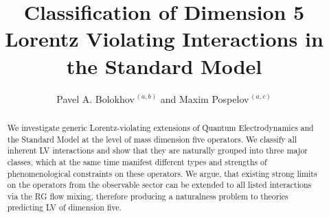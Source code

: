 \documentclass[12pt,preprintnumbers,nofootinbib]{revtex4}
\begin{document}
\renewcommand{\thefootnote}{\fnsymbol{footnote}}


\title{Classification of Dimension 5 Lorentz Violating Interactions 
		in the Standard Model}


\author{Pavel A. Bolokhov$^{\,(a,b)}$ and Maxim Pospelov$^{\,(a,c)}$}




%
%

\begin{abstract}
	We investigate generic Lorentz-violating extensions of Quantum Electrodynamics and
	the Standard Model at the level of mass dimension five operators.
	We classify all inherent LV interactions and show that they
	are naturally grouped into three major classes,
	which at the same time manifest different types and strengths of phenomenological constraints
	on these operators.
	We argue, that existing strong limits on the operators from the observable sector
	can be extended to all listed interactions via the RG flow mixing, 
	therefore producing a naturalness problem to theories predicting LV of dimension five.
\end{abstract}
	
\end{document}
